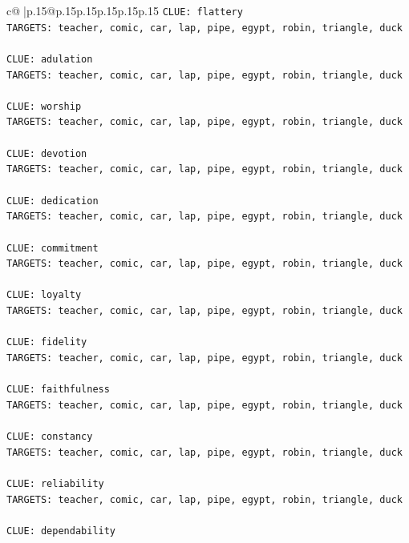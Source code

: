 \documentclass{article}
\begin{document}
{\begin{supertabular}{c@{$\;$}|p{.15\linewidth}@{}p{.15\linewidth}p{.15\linewidth}p{.15\linewidth}p{.15\linewidth}p{.15\linewidth}}
{{{\texttt{CLUE: flattery} \\
\texttt{TARGETS: teacher, comic, car, lap, pipe, egypt, robin, triangle, duck} \\
\\ 
\texttt{CLUE: adulation} \\
\texttt{TARGETS: teacher, comic, car, lap, pipe, egypt, robin, triangle, duck} \\
\\ 
\texttt{CLUE: worship} \\
\texttt{TARGETS: teacher, comic, car, lap, pipe, egypt, robin, triangle, duck} \\
\\ 
\texttt{CLUE: devotion} \\
\texttt{TARGETS: teacher, comic, car, lap, pipe, egypt, robin, triangle, duck} \\
\\ 
\texttt{CLUE: dedication} \\
\texttt{TARGETS: teacher, comic, car, lap, pipe, egypt, robin, triangle, duck} \\
\\ 
\texttt{CLUE: commitment} \\
\texttt{TARGETS: teacher, comic, car, lap, pipe, egypt, robin, triangle, duck} \\
\\ 
\texttt{CLUE: loyalty} \\
\texttt{TARGETS: teacher, comic, car, lap, pipe, egypt, robin, triangle, duck} \\
\\ 
\texttt{CLUE: fidelity} \\
\texttt{TARGETS: teacher, comic, car, lap, pipe, egypt, robin, triangle, duck} \\
\\ 
\texttt{CLUE: faithfulness} \\
\texttt{TARGETS: teacher, comic, car, lap, pipe, egypt, robin, triangle, duck} \\
\\ 
\texttt{CLUE: constancy} \\
\texttt{TARGETS: teacher, comic, car, lap, pipe, egypt, robin, triangle, duck} \\
\\ 
\texttt{CLUE: reliability} \\
\texttt{TARGETS: teacher, comic, car, lap, pipe, egypt, robin, triangle, duck} \\
\\ 
\texttt{CLUE: dependability} \\
}}}
\end{supertabular}}
\end{document}
